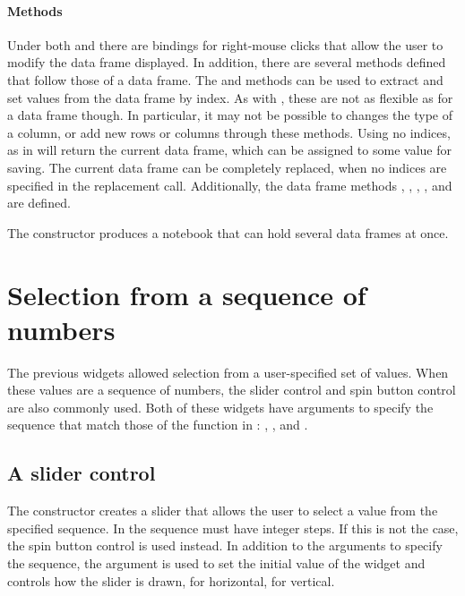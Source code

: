\paragraph{Methods} Under both  and  there are
bindings for right-mouse clicks that allow the user to modify the data
frame displayed. In addition, there are several methods defined that
follow those of a data frame. The \method{[}{gdf} and
\method{[\ASSIGN}{gdf} methods can be used to extract and set values
from the data frame by index. As with , these are not as
flexible as for a data frame though. In particular, it may not be
possible to changes the type of a column, or add new rows or columns
through these methods. Using no indices, as in  will
return the current data frame, which can be assigned to some value for
saving. The current data frame can be completely replaced, when no
indices are specified in the replacement call. Additionally, the data
frame methods , ,
, , and 
are defined.

The  constructor produces a notebook that can hold several data frames at once.

\section{Selection from a sequence of numbers}
\label{sec:gWidgets-select-from-sequ}

The previous widgets allowed selection from a user-specified set of
values. When these values are a sequence of numbers, the slider
control and spin button control are also commonly used. Both of these
widgets have arguments to specify the sequence that match those of the
 function in \R: ,
, and .

\subsection{A slider control}
\label{sec:gWidgets-slider-control}

The  constructor creates a slider that allows the
user to select a value from the specified sequence.  In
 the sequence must have integer steps. If this is
not the case, the spin button control is used instead. In addition to
the arguments to specify the sequence, the argument
 is used to set the initial value of the
widget and  controls how the slider is
drawn,  for horizontal,  for vertical.

